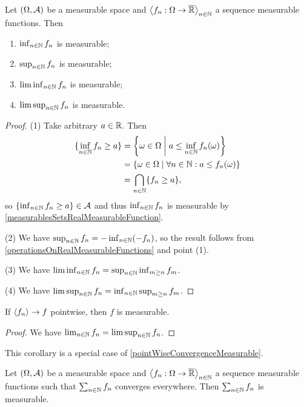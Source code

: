 \begin{proposition} \label{limitOperationsOnRealMeasurableFunctions}
Let $\sSet{\Omega, \mathcal{A}}$ be a measurable space and $\left\langle f_n: \Omega \to \overline{\mathbb{R}} \right\rangle_{n\in\mathbb{N}}$ a sequence measurable functions. Then
\begin{enumerate}
\item $\inf_{n\in\mathbb{N}}f_n$ is measurable;
\item $\sup_{n\in\mathbb{N}}f_n$ is measurable;
\item $\liminf_{n\in\mathbb{N}}f_n$ is measurable;
\item $\limsup_{n\in\mathbb{N}}f_n$ is measurable.
\end{enumerate}
\end{proposition}
\begin{proof}
(1) Take arbitrary $a\in\mathbb{R}$. Then
\begin{align*}
\{\inf_{n\in\N}f_n \geq a\} &= \setbuilder{\omega\in\Omega}{a \leq \inf_{n\in\N}f_n(\omega)} \\
&= \setbuilder{\omega\in\Omega}{\forall n \in \N: a \leq f_n(\omega)} \\
&= \bigcap_{n\in\N}\{f_n \geq a\},
\end{align*}
so $\{\inf_{n\in\mathbb{N}}f_n \geq a\} \in \mathcal{A}$ and thus $\inf_{n\in\mathbb{N}}f_n$ is measurable by \ref{measurablesSetsRealMeasurableFunction}.

(2) We have $\sup_{n\in\mathbb{N}}f_n = -\inf_{n\in\mathbb{N}}(-f_n)$, so the result follows from \ref{operationsOnRealMeasurableFunctions} and point (1).

(3) We have $\liminf_{n\in\mathbb{N}}f_n = \sup_{n\in\mathbb{N}} \inf_{m\geq n}f_m$.

(4) We have $\limsup_{n\in\mathbb{N}}f_n = \inf_{n\in\mathbb{N}} \sup_{m\geq n}f_m$.
\end{proof}
\begin{corollary} \label{pointwiseLimitMeasurable}
If $\left\langle f_n \right\rangle\to f$ pointwise, then $f$ is measurable.
\end{corollary}
\begin{proof}
We have $\lim_{n\in\mathbb{N}}f_n = \limsup_{n\in\mathbb{N}}f_n$.
\end{proof}
This corollary is a special case of \ref{pointWiseConvergenceMeasurable}.
\begin{corollary} \label{infiniteSumMeasurable}
Let $\sSet{\Omega, \mathcal{A}}$ be a measurable space and $\left\langle f_n: \Omega \to \overline{\mathbb{R}} \right\rangle_{n\in\mathbb{N}}$ a sequence measurable functions such that $\sum_{n\in\mathbb{N}}f_n$ converges everywhere. Then $\sum_{n\in\mathbb{N}}f_n$ is measurable.
\end{corollary}

